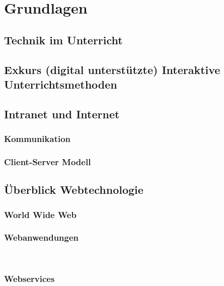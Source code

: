 \section{Grundlagen}\label{sec:grundlagen}
\subsection{Technik im Unterricht}\label{sec:technikunterricht}
\subsection{Exkurs (digital unterstützte) Interaktive Unterrichtsmethoden}\label{sec:interaktiveunterr}



\subsection{Intranet und Internet}
\subsubsection{Kommunikation}
\subsubsection{Client-Server Modell}\label{sec:clientservermodell}

\subsection{Überblick Webtechnologie}\label{sec:webbasedsoftware}

\subsubsection{World Wide Web}\label{sec:www}
%
\subsubsection{Webanwendungen}\label{sec:webanwendungen}
\
\subsubsection{Webservices}\label{sec:webservices}




